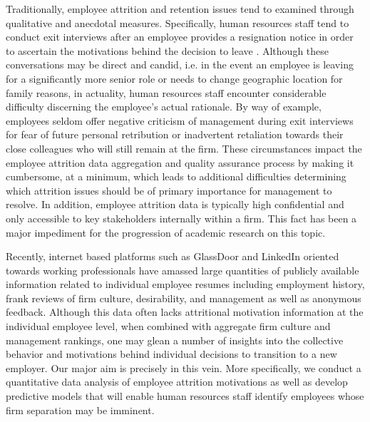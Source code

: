 \documentclass[10pt]{article}
\begin{document}
Traditionally, employee attrition and retention issues tend to examined through qualitative and anecdotal 
measures.  Specifically, human resources staff tend to conduct exit interviews after an employee provides 
a resignation notice in order to ascertain the motivations behind the decision to leave \cite{Giac1991}.  Although 
these conversations may be direct and candid, i.e. in the event an employee is leaving for a significantly 
more senior role or needs to change geographic location for family reasons, in actuality, human resources staff
encounter considerable difficulty discerning the employee's actual rationale.  By way of example, employees 
seldom offer negative criticism of management during exit interviews for fear of future personal retribution 
or inadvertent retaliation towards their close colleagues who will still remain at the firm.
These circumstances impact the employee attrition data aggregation and quality assurance process 
by making it cumbersome, at a minimum, which leads to additional difficulties determining which 
attrition issues should be of primary importance for management to resolve. In addition, employee 
attrition data is typically high confidential and only accessible to key stakeholders internally 
within a firm.  This fact has been a major impediment for the progression of academic research on 
this topic. 

Recently, internet based platforms such as GlassDoor and LinkedIn oriented towards working 
professionals have amassed large quantities of publicly available information related to individual 
employee resumes including employment history, frank reviews of firm culture, desirability, and management
as well as anonymous feedback.  Although this data often lacks attritional motivation information at 
the individual employee level, when combined with aggregate firm culture and management rankings, 
one may glean a number of insights into the collective behavior and motivations behind individual 
decisions to transition to a new employer. Our major aim is precisely in this vein.  More specifically, 
we conduct a quantitative data analysis of employee attrition motivations as well as develop 
predictive models that will enable human resources staff identify employees whose firm separation 
may be imminent.
\end{document}

